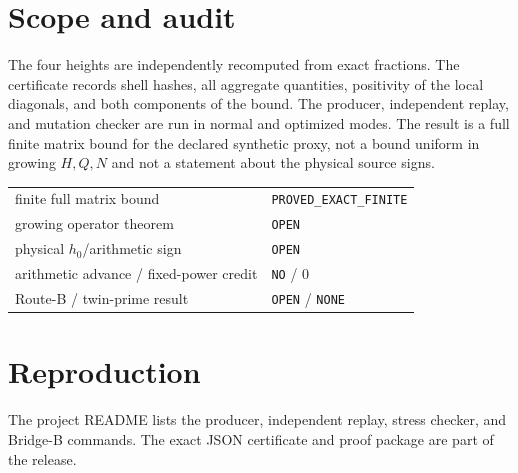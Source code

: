 \documentclass[11pt]{article}
\begin{document}
\section{Scope and audit}
The four heights are independently recomputed from exact fractions.  The
certificate records shell hashes, all aggregate quantities, positivity of
the local diagonals, and both components of the bound.  The producer,
independent replay, and mutation checker are run in normal and optimized
modes.  The result is a full finite matrix bound for the declared synthetic
proxy, not a bound uniform in growing $H,Q,N$ and not a statement about the
physical source signs.
\begin{center}\begin{tabular}{@{}ll@{}}\toprule
finite full matrix bound & \texttt{PROVED\_EXACT\_FINITE}\\
growing operator theorem & \texttt{OPEN}\\
physical $h_0$/arithmetic sign & \texttt{OPEN}\\
arithmetic advance / fixed-power credit & \texttt{NO} / 0\\
Route-B / twin-prime result & \texttt{OPEN} / \texttt{NONE}\\\bottomrule
\end{tabular}\end{center}
\section*{Reproduction}
The project README lists the producer, independent replay, stress checker,
and Bridge-B commands.  The exact JSON certificate and proof package are
part of the release.
\end{document}
